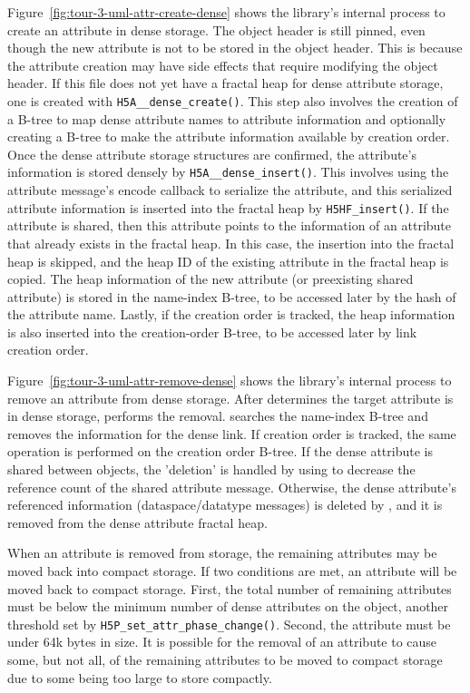 Figure~\ref{fig:tour-3-uml-attr-create-dense} shows the library's internal process to create an attribute in dense storage. The object header is still pinned, even though the new attribute is not to be stored in the object header. This is because the attribute creation may have side effects that require modifying the object header. If this file does not yet have a fractal heap for dense attribute storage, one is created with \texttt{H5A\_\_dense\_create()}. This step also involves the creation of a B-tree to map dense attribute names to attribute information and optionally creating a B-tree to make the attribute information available by creation order. Once the dense attribute storage structures are confirmed, the attribute's information is stored densely by \texttt{H5A\_\_dense\_insert()}. This involves using the attribute message's encode callback to serialize the attribute, and this serialized attribute information is inserted into the fractal heap by \texttt{H5HF\_insert()}. If the attribute is shared, then this attribute points to the information of an attribute that already exists in the fractal heap. In this case, the insertion into the fractal heap is skipped, and the heap ID of the existing attribute in the fractal heap is copied. The heap information of the new attribute (or preexisting shared attribute) is stored in the name-index B-tree, to be accessed later by the hash of the attribute name. Lastly, if the creation order is tracked, the heap information is also inserted into the creation-order B-tree, to be accessed later by link creation order.

Figure~\ref{fig:tour-3-uml-attr-remove-dense} shows the library's internal process to remove an attribute from dense storage. After  determines the target attribute is in dense storage,  performs the removal.  searches the name-index B-tree and removes the information for the dense link. If creation order is tracked, the same operation is performed on the creation order B-tree. If the dense attribute is shared between objects, the 'deletion' is handled by using  to decrease the reference count of the shared attribute message. Otherwise, the dense attribute's referenced information (dataspace/datatype messages) is deleted by , and it is removed from the dense attribute fractal heap.

When an attribute is removed from storage, the remaining attributes may be moved back into compact storage. If two conditions are met, an attribute will be moved back to compact storage. First, the total number of remaining attributes must be below the minimum number of dense attributes on the object, another threshold set by \texttt{H5P\_set\_attr\_phase\_change()}. Second, the attribute must be under 64k bytes in size. It is possible for the removal of an attribute to cause some, but not all, of the remaining attributes to be moved to compact storage due to some being too large to store compactly. 

